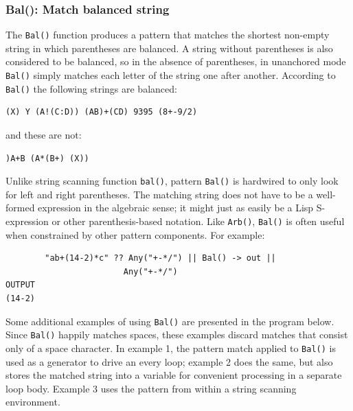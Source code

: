 \documentclass[letterpaper,12pt]{article}
\begin{document}
\subsubsection{Bal(): Match balanced string }

The {\tt Bal()} function produces a pattern that matches the shortest
non-empty string in which parentheses are balanced. A string without
parentheses is also considered to be balanced, so in the absence of
parentheses, in unanchored mode {\tt Bal()} simply matches each letter
of the string one after another. According to {\tt Bal()}
the following strings are balanced:

\begin{verbatim}
(X) Y (A!(C:D)) (AB)+(CD) 9395 (8+-9/2)
\end{verbatim}

and these are not:

\begin{verbatim}
)A+B (A*(B+) (X))
\end{verbatim}

Unlike string scanning function {\tt bal()}, pattern {\tt Bal()} is
hardwired to only look for left and right parentheses. The matching
string does not have to be a well-formed expression in the algebraic
sense; it might just as easily be a Lisp S-expression or other
parenthesis-based notation. Like {\tt Arb()}, {\tt Bal()} is often
useful when constrained by other pattern components. For example:

\begin{verbatim}
        "ab+(14-2)*c" ?? Any("+-*/") || Bal() -> out || 
                        Any("+-*/") 
OUTPUT
(14-2)
\end{verbatim}

Some additional examples of using {\tt Bal()} are presented in the
program below.  Since {\tt Bal()} happily matches spaces, these
examples discard matches that consist only of a space character.
In example 1, the pattern match applied to {\tt Bal()} is used
as a generator to drive an every loop; example 2 does the same, but
also stores the matched string into a variable for convenient
processing in a separate loop body.  Example 3 uses the pattern
from within a string scanning environment.
\end{document}
